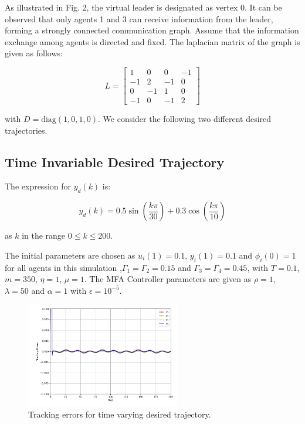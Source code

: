 \documentclass[journal,onecolumn]{IEEEtran}
\begin{document}
As illustrated in Fig. 2, the virtual leader is designated as vertex 0. It can be observed that only agents 1 and 3 can receive information from the leader, forming a strongly connected communication graph. Assume that the information exchange among agents is directed and fixed. The laplacian matrix of the graph is given as follows:

\[
    L = \begin{bmatrix}
    1 & 0 & 0 & -1 \\
    -1 & 2 & -1 & 0 \\
    0 & -1 & 1 & 0 \\
    -1 & 0 & -1 & 2
    \end{bmatrix}
\]

with \( D = \text{diag}(1, 0, 1, 0) \). We consider the following two different desired trajectories.

\subsection{Time Invariable Desired Trajectory}

The expression for \( y_d(k) \) is:

\[
y_d(k) = 0.5 \sin\left(\frac{k \pi}{30}\right) + 0.3  \cos\left(\frac{k \pi}{10}\right)
\]

as \( k \) in the range \( 0 \leq k \leq 200 \).

The initial parameters are chosen as \(u_i(1)=0.1\), \(y_i(1)=0.1\) and \(\phi_i(0)=1 \) for all agents in this simulation ,\(\Gamma_{1}=\Gamma_{2}=0.15\) and \(\Gamma_{3}=\Gamma_{4}=0.45\), with \(T=0.1\), \(m=350\), \(\eta=1\), \(\mu=1\). The MFA Controller parameters are given as \(\rho=1\), \(\lambda=50\) and \(\alpha=1\) with \(\epsilon=10^{-5}\).
\begin{figure}[H]
    \centering
    \includegraphics[width=0.6\textwidth]{Figure_2.png}
    \caption{Tracking errors for time varying desired trajectory.}
    \label{fig:figure_2} %
\end{figure}
\end{document}

